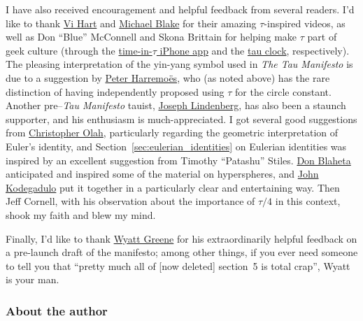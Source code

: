 I have also received encouragement and helpful feedback from several readers. I'd like to thank \href{https://www.youtube.com/watch?v=jG7vhMMXagQ}{Vi Hart} and \href{https://www.youtube.com/watch?v=3174T-3-59Q}{Michael Blake} for their amazing $\tau$-inspired videos, as well as Don ``Blue'' McConnell and Skona Brittain for helping make $\tau$ part of geek culture (through the \href{http://tauclock.com/}{time-in-$\tau$ iPhone app} and the \href{http://www.sbcrafts.net/clocks/}{tau clock}, respectively). The pleasing interpretation of the yin-yang symbol used in \emph{The Tau Manifesto} is due to a suggestion by \href{http://www.harremoes.dk/Peter/}{Peter Harremo\"{e}s}, who (as noted above) has the rare distinction of having independently proposed using $\tau$ for the circle constant. Another pre--\emph{Tau Manifesto} tauist, \href{https://sites.google.com/site/taubeforeitwascool/}{Joseph Lindenberg}, has also been a staunch supporter, and his enthusiasm is much-appreciated. I got several good suggestions from \href{https://christopherolah.wordpress.com/about-me}{Christopher Olah}, particularly regarding the geometric interpretation of Euler's identity, and Section~\ref{sec:eulerian_identities} on Eulerian identities was inspired by an excellent suggestion from Timothy ``Patashu'' Stiles. \href{http://www.blahedo.org/blog/archives/001083.html}{Don Blaheta} anticipated and inspired some of the material on hyperspheres, and \href{http://spikedmath.com/forum/viewtopic.php?f=30&t=147\#p1577}{John Kodegadulo} put it together in a particularly clear and entertaining way. Then Jeff Cornell, with his observation about the importance of $\tau/4$ in this context, shook my faith and blew my mind.

Finally, I'd like to thank \href{https://techiferous.com/}{Wyatt Greene} for his extraordinarily helpful feedback on a pre-launch draft of the manifesto; among other things, if you ever need someone to tell you that ``pretty much all of [now deleted] section~5 is total crap'', Wyatt is your man.



    \subsubsection{About the author} %
    \label{sec:about_the_author}


